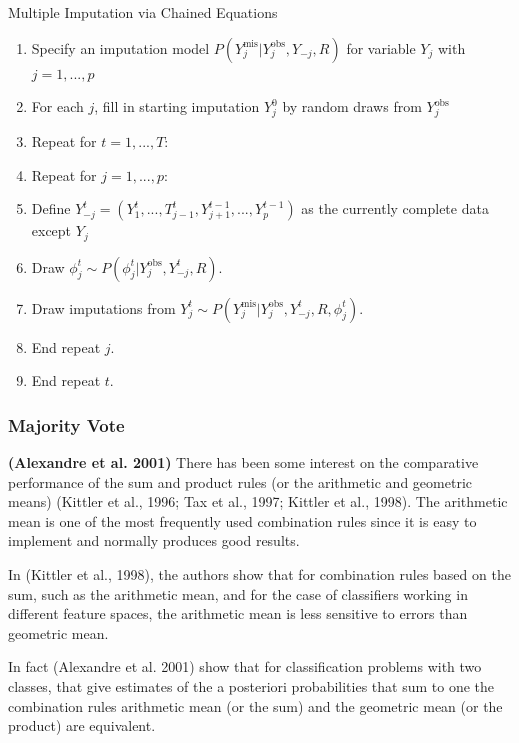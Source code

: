\documentclass[12pt,]{article}
\begin{document}
\begin{algorithm}[H]
\label{alg:mice-alg}
\caption{Multiple Imputation via Chained Equations}
\DontPrintSemicolon
\SetAlgoLined
\BlankLine

\begin{enumerate}
  \item Specify an imputation model $P(Y^{\text{mis}}_j \vert Y^{\text{obs}}_j, Y_{-j}, R)$ for variable $Y_j$ with $j=1,...,p$
  \item For each $j$, fill in starting imputation $Y^0_j$ by random draws from $Y^{\text{obs}}_j$
  \item Repeat for $t=1,...,T:$
  \item Repeat for $j=1,...,p:$
  \item Define $Y^t_{-j} = (Y^t_1,...,T^t_{j-1}, Y^{t-1}_{j+1},..., Y^{t-1}_p)$ as the currently complete data except $Y_j$ 
  \item Draw $\phi^t_j \sim P(\phi^t_j \vert Y^{\text{obs}}_j, Y^t_{-j}, R)$.
  \item Draw imputations from $Y^t_j \sim P(Y^{ \text{mis} }_j \vert Y^{ \text{obs} }_j, Y^t_{-j}, R, \phi^t_j)$.
  \item End repeat $j$.
  \item End repeat $t$.

\end{enumerate}
\BlankLine

\end{algorithm}

\subsubsection{Majority Vote}\label{majority-vote}

\textbf{(Alexandre et al. 2001)} There has been some interest on the
comparative performance of the sum and product rules (or the arithmetic
and geometric means) (Kittler et al., 1996; Tax et al., 1997; Kittler et
al., 1998). The arithmetic mean is one of the most frequently used
combination rules since it is easy to implement and normally produces
good results.

In (Kittler et al., 1998), the authors show that for combination rules
based on the sum, such as the arithmetic mean, and for the case of
classifiers working in different feature spaces, the arithmetic mean is
less sensitive to errors than geometric mean.

In fact (Alexandre et al. 2001) show that for classification problems
with two classes, that give estimates of the a posteriori probabilities
that sum to one the combination rules arithmetic mean (or the sum) and
the geometric mean (or the product) are equivalent.
\end{document}
